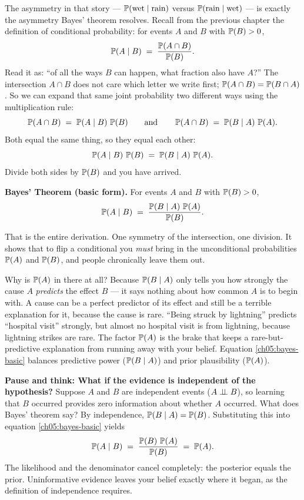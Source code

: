 The asymmetry in that story --- $\P(\text{wet} \given \text{rain})$ versus
$\P(\text{rain} \given \text{wet})$ --- is exactly the asymmetry Bayes' theorem
resolves. Recall from the previous chapter the definition of conditional probability:
for events $A$ and $B$ with $\P(B) > 0$,
\[
  \P(A \given B) \;=\; \frac{\P(A \cap B)}{\P(B)}.
\]
Read it as: ``of all the ways $B$ can happen, what fraction also have $A$?'' The intersection $A \cap B$ does not care which letter we write first;
$\P(A \cap B) = \P(B \cap A)$. So we can expand that same joint probability two different
ways using the multiplication rule:
\[
  \P(A \cap B) \;=\; \P(A \given B)\,\P(B)
  \qquad\text{and}\qquad
  \P(A \cap B) \;=\; \P(B \given A)\,\P(A).
\]
Both equal the same thing, so they equal each other:
\[
  \P(A \given B)\,\P(B) \;=\; \P(B \given A)\,\P(A).
\]
Divide both sides by $\P(B)$ and you have arrived.

\begin{formalbox}
\textbf{Bayes' Theorem (basic form).} For events $A$ and $B$ with $\P(B) > 0$,
\begin{equation}
  \P(A \given B) \;=\; \frac{\P(B \given A)\,\P(A)}{\P(B)}.
  \label{ch05:bayes-basic}
\end{equation}
\end{formalbox}

That is the entire derivation. One symmetry of the intersection, one division. It shows that to flip a conditional you
\emph{must} bring in the unconditional probabilities $\P(A)$ and $\P(B)$, and people
chronically leave them out.

\begin{whybox}
Why is $\P(A)$ in there at all? Because $\P(B\given A)$ only tells you how strongly the
cause $A$ \emph{predicts} the effect $B$ --- it says nothing about how common $A$ is to
begin with. A cause can be a perfect predictor of its effect and still be a terrible
explanation for it, because the cause is rare. ``Being struck by lightning''
predicts ``hospital visit'' strongly, but almost no hospital visit is from
lightning, because lightning strikes are rare. The factor $\P(A)$ is the brake that
keeps a rare-but-predictive explanation from running away with your belief. Equation \eqref{ch05:bayes-basic} balances predictive power ($\P(B\given A)$) and prior plausibility ($\P(A)$).
\end{whybox}

\begin{recoverybox}
\textbf{Pause and think: What if the evidence is independent of the hypothesis?}
Suppose $A$ and $B$ are independent events ($A \indep B$), so learning that $B$ occurred
provides zero information about whether $A$ occurred. What does Bayes' theorem say?
By independence, $\P(B \given A) = \P(B)$. Substituting this into equation
\eqref{ch05:bayes-basic} yields
\[
  \P(A \given B) \;=\; \frac{\P(B)\,\P(A)}{\P(B)} \;=\; \P(A).
\]
The likelihood and the denominator cancel completely: the posterior equals the prior.
Uninformative evidence leaves your belief exactly where it began, as the definition
of independence requires.
\end{recoverybox}


